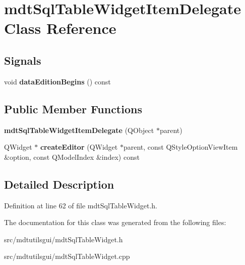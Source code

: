 \hypertarget{classmdt_sql_table_widget_item_delegate}{
\section{mdtSqlTableWidgetItemDelegate Class Reference}
\label{classmdt_sql_table_widget_item_delegate}
}
\subsection*{Signals}
\begin{DoxyCompactItemize}
\item 
\hypertarget{classmdt_sql_table_widget_item_delegate_af2fdf7d0a1ead61dccdb047240e96643}{
void {\bfseries dataEditionBegins} () const }
\label{classmdt_sql_table_widget_item_delegate_af2fdf7d0a1ead61dccdb047240e96643}

\end{DoxyCompactItemize}
\subsection*{Public Member Functions}
\begin{DoxyCompactItemize}
\item 
\hypertarget{classmdt_sql_table_widget_item_delegate_a47f657db0c8746f989758df47e68e6dd}{
{\bfseries mdtSqlTableWidgetItemDelegate} (QObject $\ast$parent)}
\label{classmdt_sql_table_widget_item_delegate_a47f657db0c8746f989758df47e68e6dd}

\item 
\hypertarget{classmdt_sql_table_widget_item_delegate_aed1fee59493153f5553e96dfceaddc81}{
QWidget $\ast$ {\bfseries createEditor} (QWidget $\ast$parent, const QStyleOptionViewItem \&option, const QModelIndex \&index) const }
\label{classmdt_sql_table_widget_item_delegate_aed1fee59493153f5553e96dfceaddc81}

\end{DoxyCompactItemize}


\subsection{Detailed Description}


Definition at line 62 of file mdtSqlTableWidget.h.



The documentation for this class was generated from the following files:\begin{DoxyCompactItemize}
\item 
src/mdtutilsgui/mdtSqlTableWidget.h\item 
src/mdtutilsgui/mdtSqlTableWidget.cpp\end{DoxyCompactItemize}
